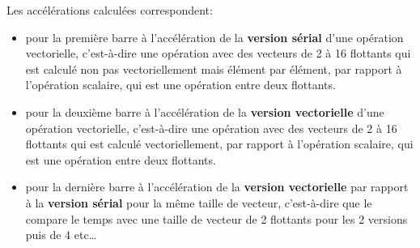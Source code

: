 \documentclass[12pt, letterpaper]{article}
\begin{document}
\begin{enumerate}
\begin{enumerate}
Les accélérations calculées correspondent:
\begin{itemize}
\item pour la première barre à l’accélération de la
\textbf{version sérial} d'une opération vectorielle, c'est-à-dire une opération
avec des vecteurs de 2 à 16 flottants qui est calculé non pas
vectoriellement mais élément par élément, par rapport à l'opération
scalaire, qui est une opération entre deux flottants.
\item pour la deuxième barre à l’accélération de la \textbf{version vectorielle} d'une
opération vectorielle, c'est-à-dire une opération avec des vecteurs de 2
à 16 flottants qui est calculé vectoriellement, par rapport à
l'opération scalaire, qui est une opération entre deux flottants.
\item pour la dernière barre à l’accélération de la \textbf{version vectorielle} par
rapport à la \textbf{version sérial} pour la même taille de vecteur,
c'est-à-dire que le compare le temps avec une taille de vecteur de 2
flottants pour les 2 versions puis de 4 etc\ldots{}
\end{itemize}
\end{enumerate}
\end{enumerate}
\end{document}
